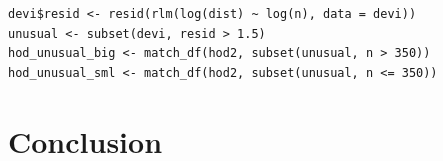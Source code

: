\documentclass[oneside]{article}
\begin{document}
\begin{verbatim}
devi$resid <- resid(rlm(log(dist) ~ log(n), data = devi))
unusual <- subset(devi, resid > 1.5)
hod_unusual_big <- match_df(hod2, subset(unusual, n > 350))
hod_unusual_sml <- match_df(hod2, subset(unusual, n <= 350))
\end{verbatim}

\section{Conclusion}


\end{document}
